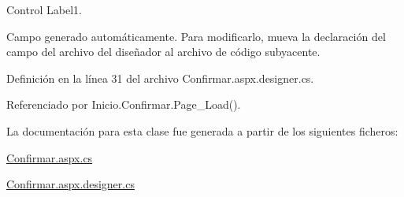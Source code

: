 Control Label1. 

Campo generado automáticamente. Para modificarlo, mueva la declaración del campo del archivo del diseñador al archivo de código subyacente. 

Definición en la línea 31 del archivo Confirmar.\+aspx.\+designer.\+cs.



Referenciado por Inicio.\+Confirmar.\+Page\+\_\+\+Load().



La documentación para esta clase fue generada a partir de los siguientes ficheros\+:\begin{DoxyCompactItemize}
\item 
\mbox{\hyperlink{Confirmar_8aspx_8cs}{Confirmar.\+aspx.\+cs}}\item 
\mbox{\hyperlink{Confirmar_8aspx_8designer_8cs}{Confirmar.\+aspx.\+designer.\+cs}}\end{DoxyCompactItemize}
